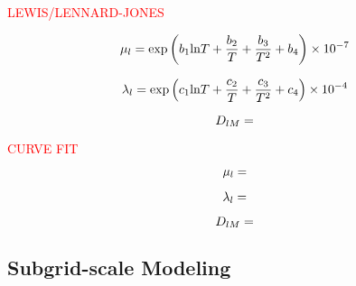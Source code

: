 \textcolor{red}{LEWIS/LENNARD-JONES}

\begin{equation}
	\mu_{l} = \text{exp} \left(b_1 \text{ln} T + \frac{b_2}{T} + \frac{b_3}{T^2} + b_4 \right) \times 10^{-7}
\end{equation}

\begin{equation}
	\lambda_{l} = \text{exp} \left(c_1 \text{ln} T + \frac{c_2}{T} + \frac{c_3}{T^2} + c_4 \right) \times 10^{-4}
\end{equation}

\begin{equation}
	D_{l M} =
\end{equation}

\textcolor{red}{CURVE FIT}

\begin{equation}
	\mu_{l} =
\end{equation}

\begin{equation}
	\lambda_{l} =
\end{equation}

\begin{equation}
	D_{l M} =
\end{equation}

\subsection{Subgrid-scale Modeling}